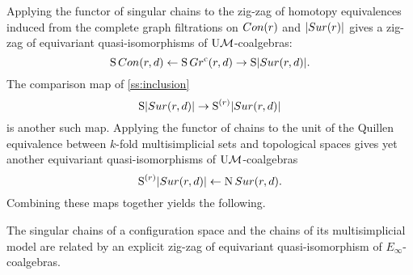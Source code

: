 Applying the functor of singular chains to the zig-zag of homotopy equivalences induced from the complete graph filtrations on $Con(r)$ and $\lvert Sur(r)\rvert$ gives a zig-zag of equivariant quasi-isomorphisms of $\mathrm{U}\mathcal{M}$-coalgebras:
\[
\operatorname{S}Con(r,d) \leftarrow \operatorname{S} Gr^{\mathrm{c}}(r,d) \to \operatorname{S}\lvert Sur(r,d)\rvert.
\]
The comparison map of \cref{ss:inclusion}
\[
\operatorname{S}\lvert Sur(r,d)\rvert \to \operatorname{S}^{(r)}\lvert Sur(r,d)\rvert
\]
is another such map.
Applying the functor of chains to the unit of the Quillen equivalence between $k$-fold multisimplicial sets and topological spaces gives yet another equivariant quasi-isomorphisms of $\mathrm{U}\mathcal{M}$-coalgebras
\[
\operatorname{S}^{(r)}\lvert Sur(r,d)\rvert \leftarrow \operatorname{N}Sur(r,d).
\]
Combining these maps together yields the following.
\begin{theorem*}
	The singular chains of a configuration space and the chains of its multisimplicial model are related by an explicit zig-zag of equivariant quasi-isomorphism of $E_\infty$-coalgebras.
\end{theorem*}

%
